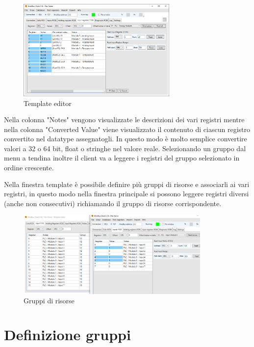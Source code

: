 \begin{figure}[H]
\centering
\includegraphics[width=0.70\textwidth]{../Img/ModBus_Client_Template_ReadDemo00.PNG}
\caption{Template editor}
\end{figure}

Nella colonna "Notes" vengono visualizzate le descrizioni dei vari registri 
mentre nella colonna "Converted Value" viene visualizzato il contenuto
di ciascun registro convertito nel datatype assegnatogli. In questo modo è molto semplice 
convertire valori a 32 o 64 bit, float o stringhe nel valore reale.
Selezionando un gruppo dal menu a tendina inoltre il client va a leggere i registri
del gruppo selezionato in ordine crescente.

Nella finestra template è possibile definire più gruppi di risorse e
associarli ai vari registri, in questo modo nella finestra principale si 
possono leggere registri diversi (anche non consecutivi)
richiamando il gruppo di risorse corrispondente.

\begin{figure}[H]
\centering
\includegraphics[width=0.85\textwidth]{../Img/ModBus_Client_Template_Group00.PNG}
\caption{Gruppi di risorse}
\end{figure}

\newpage
\section{Definizione gruppi}


